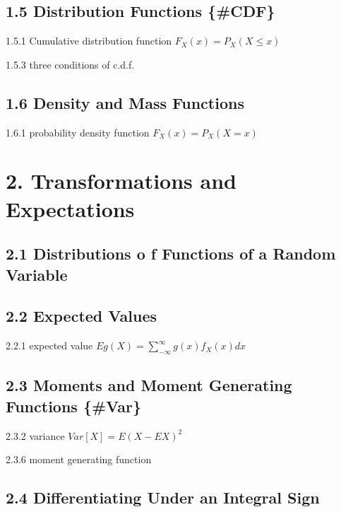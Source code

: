 \documentclass[10pt,twocolumn,portrait]{article}
\begin{document}
\hypertarget{cdfP}{%
\subsection{1.5 Distribution Functions \{\#CDF\}}\label{cdfP}}

1.5.1 Cumulative distribution function \(F_X(x)=P_X(X\le x)\)

1.5.3 three conditions of c.d.f.

\hypertarget{PDF}{%
\subsection{1.6 Density and Mass Functions}\label{PDF}}

1.6.1 probability density function \(F_X(x)=P_X(X= x)\)

\hypertarget{transformations-and-expectations}{%
\section{2. Transformations and
Expectations}\label{transformations-and-expectations}}

\hypertarget{distributions-o-f-functions-of-a-random-variable}{%
\subsection{2.1 Distributions o f Functions of a Random
Variable}\label{distributions-o-f-functions-of-a-random-variable}}

\hypertarget{mean}{%
\subsection{2.2 Expected Values}\label{mean}}

2.2.1 expected value \(Eg(X)=\sum_{-\infty}^\infty g(x)f_X(x)dx\)

\hypertarget{MGF}{%
\subsection{2.3 Moments and Moment Generating Functions
\{\#Var\}}\label{MGF}}

2.3.2 variance \(Var[X]=E(X-EX)^2\)

2.3.6 moment generating function

\hypertarget{differentiating-under-an-integral-sign}{%
\subsection{2.4 Differentiating Under an Integral
Sign}\label{differentiating-under-an-integral-sign}}
\end{document}
